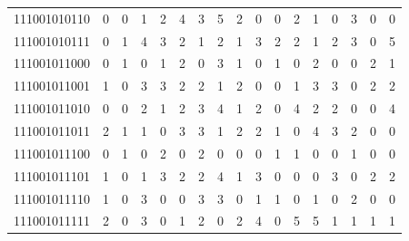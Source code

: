 \documentclass[10pt,a4paper]{article}
\begin{document}
\begin{longtable}{ |c|c|c|c|c|c|c|c|c|c|c|c|c|c|c|c|c| }
    111001010110              & 0                            & 0                                & 1                            & 2                              & 4   & 3   & 5   & 2   & 0   & 0   & 2   & 1   & 0   & 3   & 0   & 0   \\
    111001010111              & 0                            & 1                                & 4                            & 3                              & 2   & 1   & 2   & 1   & 3   & 2   & 2   & 1   & 2   & 3   & 0   & 5   \\
    111001011000              & 0                            & 1                                & 0                            & 1                              & 2   & 0   & 3   & 1   & 0   & 1   & 0   & 2   & 0   & 0   & 2   & 1   \\
    111001011001              & 1                            & 0                                & 3                            & 3                              & 2   & 2   & 1   & 2   & 0   & 0   & 1   & 3   & 3   & 0   & 2   & 2   \\
    111001011010              & 0                            & 0                                & 2                            & 1                              & 2   & 3   & 4   & 1   & 2   & 0   & 4   & 2   & 2   & 0   & 0   & 4   \\
    111001011011              & 2                            & 1                                & 1                            & 0                              & 3   & 3   & 1   & 2   & 2   & 1   & 0   & 4   & 3   & 2   & 0   & 0   \\
    111001011100              & 0                            & 1                                & 0                            & 2                              & 0   & 2   & 0   & 0   & 0   & 1   & 1   & 0   & 0   & 1   & 0   & 0   \\
    111001011101              & 1                            & 0                                & 1                            & 3                              & 2   & 2   & 4   & 1   & 3   & 0   & 0   & 0   & 3   & 0   & 2   & 2   \\
    111001011110              & 1                            & 0                                & 3                            & 0                              & 0   & 3   & 3   & 0   & 1   & 1   & 0   & 1   & 0   & 2   & 0   & 0   \\
    111001011111              & 2                            & 0                                & 3                            & 0                              & 1   & 2   & 0   & 2   & 4   & 0   & 5   & 5   & 1   & 1   & 1   & 1   \\

\end{longtable}
\end{document}
